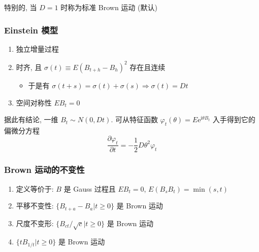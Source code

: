 \documentclass[11pt,a4paper,twocolumn]{article} %
\numberwithin{equation}{section} %
\newcommand\mi{\mathrm{i}}
\newcommand\e{\mathrm{e}} %
\begin{document}
特别的, 当 $D=1$ 时称为标准 Brown 运动 (默认)
\subsubsection{Einstein 模型} %
\label{ssub:einstein_model}
\begin{enumerate}
	\item 独立增量过程
	\item 时齐, 且 $\sigma(t)\equiv E(B_{t+h} - B_h)^2$ 存在且连续
	\begin{itemize}
		\item 于是有 $\sigma(t+s) = \sigma (t) + \sigma(s) \Rightarrow
		\sigma(t) = Dt$
	\end{itemize}
	\item 空间对称性 $EB_t = 0$
\end{enumerate}
据此有结论, 一维 $B_t\sim N(0, Dt)$. 可从特征函数 
$\varphi_t(\theta) = E\e^{\mi\theta B_t}$ 入手得到它的偏微分方程
\begin{equation}
	\frac{\partial \varphi_t}{\partial t} = -\frac 12 D\theta^2\varphi_t
\end{equation}
\subsubsection{Brown 运动的不变性} %
\label{ssub:brown_property}
\begin{enumerate}
	\item 定义等价于: $B$ 是 Gauss 过程且 $EB_t = 0$, $E(B_sB_t) = \min(s,t)$
	\item 平移不变性: $\{B_{t+a} - B_a | t\ge 0\}$ 是 Brown 运动
	\item 尺度不变形: $\{B_{ct}/\sqrt c | t\ge 0\}$ 是 Brown 运动
	\item $\{t B_{1/t}|t\ge 0\}$ 是 Brown 运动
\end{enumerate}
\end{document}
